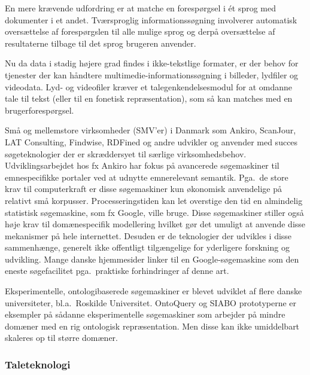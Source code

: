\documentclass[]{../../metanetpaper}
\begin{document}
\begin{multicols}{2}

En mere kr\ae vende udfordring er at matche en foresp\o rgsel i \'{e}t sprog med dokumenter i et andet. Tv\ae rsproglig informationss\o gning involverer automatisk overs\ae ttelse af foresp\o rgslen til alle mulige sprog og \mbox{derp\aa} overs\ae ttelse af resultaterne tilbage til det sprog brugeren anvender.

Nu da data i stadig h\o jere grad findes i ikke-tekstlige formater, er der behov for tjenester der kan h\aa ndtere multimedie-informationss\o gning i billeder, lydfiler og videodata. Lyd- og videofiler kr\ae ver et talegenkendelsesmodul for at omdanne tale til tekst (eller til en fonetisk repr\ae sentation), som \mbox{s\aa} kan matches med en brugerforesp\o rgsel. 

\mbox{Sm\aa} og mellemstore virksomheder (SMV'er) i Danmark som Ankiro, ScanJour, LAT Consulting, Findwise, RDFined og andre udvikler og anvender med succes s\o geteknologier der er skr\ae ddersyet til s\ae rlige virksomhedsbehov. Udviklingsarbejdet hos fx Ankiro har fokus \mbox{p\aa} avancerede s\o gemaskiner til emnespecifikke portaler ved at udnytte emnerelevant semantik. Pga.\ de store krav til computerkraft er disse s\o gemaskiner kun \o konomisk anvendelige \mbox{p\aa} relativt \mbox{sm\aa} korpusser. Processeringstiden kan let overstige den tid en almindelig statistisk s\o gemaskine, som fx Google, ville bruge. Disse s\o gemaskiner stiller \mbox{ogs\aa} h\o je krav til dom\ae nespecifik modellering hvilket g\o r det umuligt at anvende disse mekanismer \mbox{p\aa} hele internettet. Desuden er de teknologier der udvikles i disse sammenh\ae nge, generelt ikke offentligt tilg\ae ngelige for yderligere forskning og udvikling. Mange danske hjemmesider linker til en Google-s\o gemaskine som den eneste s\o gefacilitet pga.\ praktiske forhindringer af denne art.

Eksperimentelle, ontologibaserede s\o ge\-maskiner er blevet udviklet af flere danske universiteter, bl.a.\ Roskilde Universitet. OntoQuery og SIABO prototyperne er eksempler \mbox{p\aa} s\aa danne eksperimentelle s\o gemaskiner som arbejder \mbox{p\aa} mindre dom\ae ner med en rig ontologisk repr\ae sentation.   Men disse kan ikke umiddelbart skaleres op til st\o rre dom\ae ner.
  
\subsubsection{Taleteknologi}


\end{multicols}
\end{document}
